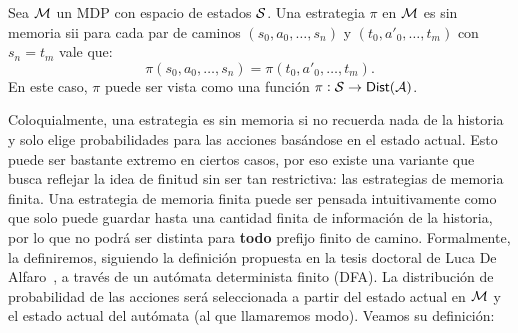 
\begin{definition}
	Sea $\mathcal{M}$ un MDP con espacio de estados $\mathcal{S}$. Una estrategia $\pi$ en $\mathcal{M}$ es sin memoria sii para cada par de caminos $(s_0, a_0, \dots, s_n)$ y $(t_0, a'_0, \dots, t_m)$ con $s_n = t_m$ vale que:
	$$\pi(s_0, a_0, \dots, s_n) = \pi(t_0, a'_0, \dots, t_m).$$
	En este caso, $\pi$ puede ser vista como una función $\pi : \mathcal{S} \rightarrow \mathsf{Dist}(\mathcal{A})$.
\end{definition}

Coloquialmente, una estrategia es sin memoria si no recuerda nada de la
historia y solo elige probabilidades para las acciones basándose en el estado
actual. Esto puede ser bastante extremo en ciertos casos, por eso existe una
variante que busca reflejar la idea de finitud sin ser tan restrictiva: las
estrategias de memoria finita. Una estrategia de memoria finita puede ser
pensada intuitivamente como que solo puede guardar hasta una cantidad finita de
información de la historia, por lo que no podrá ser distinta para \textbf{todo}
prefijo finito de camino. Formalmente, la definiremos, siguiendo la definición
propuesta en la tesis doctoral de Luca De Alfaro~\cite{AlfaroThesis}, a través
de un autómata determinista finito (DFA). La distribución de probabilidad de
las acciones será seleccionada a partir del estado actual en $\mathcal{M}$ y el estado
actual del autómata (al que llamaremos modo). Veamos su definición:

